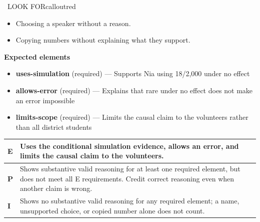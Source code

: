 \documentclass[11pt]{article}
\begin{document}
\begin{callout}{\IconWarn\ LOOK FOR}{calloutred}
\begin{itemize}[leftmargin=1.5em,itemsep=2pt,topsep=2pt]
  \item Choosing a speaker without a reason.
  \item Copying numbers without explaining what they support.
\end{itemize}
\end{callout}


\textbf{Expected elements}
\begin{itemize}[leftmargin=1.5em,itemsep=2pt,topsep=2pt]
  \item \textbf{uses-simulation} (required) --- Supports Nia using 18/2,000 under no effect
  \item \textbf{allows-error} (required) --- Explains that rare under no effect does not make an error impossible
  \item \textbf{limits-scope} (required) --- Limits the causal claim to the volunteers rather than all district students
\end{itemize}

{\small\renewcommand{\arraystretch}{1.25}
\noindent\begin{tabular}{|p{0.5in}|p{5.9in}|}
\hline
\textbf{E} & Uses the conditional simulation evidence, allows an error, and limits the causal claim to the volunteers. \\ \hline
\textbf{P} & Shows substantive valid reasoning for at least one required element, but does not meet all E requirements. Credit correct reasoning even when another claim is wrong. \\ \hline
\textbf{I} & Shows no substantive valid reasoning for any required element; a name, unsupported choice, or copied number alone does not count. \\ \hline
\end{tabular}}

\clearpage
{}
\end{document}
